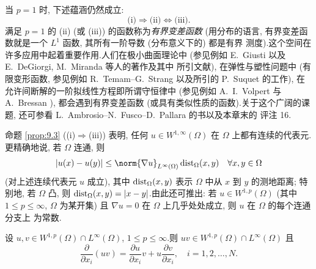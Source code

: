 \begin{starremark}
\label{rem:9.6}
当 $p=1$ 时, 下述蕴涵仍然成立:
\begin{equation*}
\text{(i)}\Rightarrow\text{(ii)}\iff\text{(iii)}.
\end{equation*}
满足 $p=1$ 的 (ii) (或 (iii)) 的函数称为\emph{有界变差函数} (用分布的语言,
有界变差函数就是一个 $L^1$ 函数, 其所有一阶导数 (分布意义下的) 都是有界
测度).这个空间在许多应用中起着重要作用.人们在极小曲面理论中 (参见例如
E.~Giusti  以及 E.~DeGiorgi, M.~Miranda 等人的著作及其中
所引文献), 在弹性与塑性问题中 (有限变形函数, 参见例如
R.~Temam--G.~Strang  以及所引的 P.~Suquet 的工作), 在允许间断解的一阶拟线性方程即所谓守恒律中 (参见例如
A.~I.~Volpert  与 A.~Bressan ),
都会遇到有界变差函数 (或具有类似性质的函数).关于这个广阔的课题, 还可参看
L.~Ambrosio--N.~Fusco--D.~Pallara  的书以及本章末的
评注 16.
\end{starremark}

\begin{remark}
\label{rem:9.7}
命题  \ref{prop:9.3} ((i)$\Rightarrow$(iii)) 表明, 任何
$u\in W^{1,\infty}(\Omega)$ 在 $\Omega$ 上都有连续的代表元.更精确地说,
若 $\Omega$ 连通, 则
\begin{equation}
\abs{u(x)-u(y)}\le\norm{\nabla u}_{L^\infty(\Omega)}
\dist_\Omega(x,y)\quad\forall x,y\in\Omega
\label{eq:9.5}
\end{equation}
(对上述连续代表元 $u$ 成立), 其中 $\operatorname{dist}_\Omega(x,y)$ 表示 $\Omega$ 中从
$x$ 到 $y$ 的测地距离; 特别地, 若 $\Omega$ 凸, 则
$\operatorname{dist}_\Omega(x,y)=\left|x-y\right|$.由此还可推出: 若
$u\in W^{1,p}(\Omega)$ (其中 $1\le p\le\infty$, $\Omega$ 为某开集) 且
$\nabla u=0$ 在 $\Omega$ 上几乎处处成立, 则 $u$ 在 $\Omega$ 的每个连通分支上
为常数.
\end{remark}

\begin{proposition}[乘积的微分]
\label{prop:9.4}
设 $u,v\in W^{1,p}(\Omega)\cap L^\infty(\Omega)$, $1\le p\le\infty$.则
$uv\in W^{1,p}(\Omega)\cap L^\infty(\Omega)$ 且
\begin{equation*}
\frac{\partial}{\partial x_i}(uv)=\frac{\partial u}{\partial x_i}v
+u\frac{\partial v}{\partial x_i},\quad i=1,2,\dots,N.
\end{equation*}
\end{proposition}

